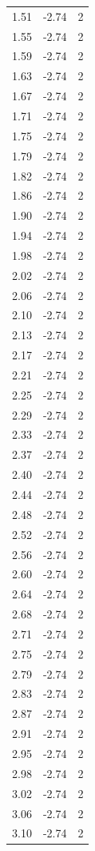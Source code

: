\begin{longtable}{lrr}
  1.51 & -2.74 & 2 \\
  1.55 & -2.74 & 2 \\
  1.59 & -2.74 & 2 \\
  1.63 & -2.74 & 2 \\
  1.67 & -2.74 & 2 \\
  1.71 & -2.74 & 2 \\
  1.75 & -2.74 & 2 \\
  1.79 & -2.74 & 2 \\
  1.82 & -2.74 & 2 \\
  1.86 & -2.74 & 2 \\
  1.90 & -2.74 & 2 \\
  1.94 & -2.74 & 2 \\
  1.98 & -2.74 & 2 \\
  2.02 & -2.74 & 2 \\
  2.06 & -2.74 & 2 \\
  2.10 & -2.74 & 2 \\
  2.13 & -2.74 & 2 \\
  2.17 & -2.74 & 2 \\
  2.21 & -2.74 & 2 \\
  2.25 & -2.74 & 2 \\
  2.29 & -2.74 & 2 \\
  2.33 & -2.74 & 2 \\
  2.37 & -2.74 & 2 \\
  2.40 & -2.74 & 2 \\
  2.44 & -2.74 & 2 \\
  2.48 & -2.74 & 2 \\
  2.52 & -2.74 & 2 \\
  2.56 & -2.74 & 2 \\
  2.60 & -2.74 & 2 \\
  2.64 & -2.74 & 2 \\
  2.68 & -2.74 & 2 \\
  2.71 & -2.74 & 2 \\
  2.75 & -2.74 & 2 \\
  2.79 & -2.74 & 2 \\
  2.83 & -2.74 & 2 \\
  2.87 & -2.74 & 2 \\
  2.91 & -2.74 & 2 \\
  2.95 & -2.74 & 2 \\
  2.98 & -2.74 & 2 \\
  3.02 & -2.74 & 2 \\
  3.06 & -2.74 & 2 \\
  3.10 & -2.74 & 2 \\

\end{longtable}
